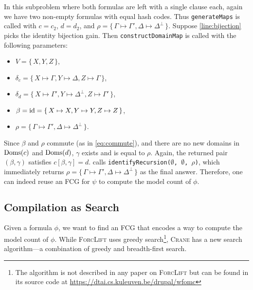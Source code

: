 \begin{example}
  In this subproblem where both formulas are left with a single clause each,
  again we have two non-empty formulas with equal hash codes. Thus
  \texttt{generateMaps} is called with $c = c_2$, $d = d_2$, and
  $\rho = \{\, \Gamma \mapsto \Gamma', \Delta \mapsto \Delta^\bot \,\}$. Suppose
  \cref{line:bijection} picks the identity bijection gain. Then
  \texttt{constructDomainMap} is called with the following parameters:
  \begin{itemize}
    \item $V = \{\, X, Y, Z \,\}$,
    \item
          $\delta_c = \{\, X \mapsto \Gamma, Y \mapsto \Delta, Z \mapsto \Gamma \,\}$,
    \item
          $\delta_d = \{\, X \mapsto \Gamma', Y \mapsto \Delta^\bot, Z \mapsto \Gamma' \,\}$,
    \item $\beta = \operatorname{id} = \{\, X \mapsto X, Y \mapsto Y, Z \mapsto Z \,\}$,
    \item $\rho = \{\, \Gamma \mapsto \Gamma', \Delta \mapsto \Delta^\bot \,\}$.
  \end{itemize}
  Since $\beta$ and $\rho$ commute (as in \cref{eq:commute}), and there are no
  new domains in $\operatorname{Doms}(c)$ and $\operatorname{Doms}(d)$, $\gamma$ exists and is equal to
  $\rho$. Again, the returned pair $(\beta, \gamma)$ satisfies
  $c[\beta, \gamma] = d$.  calls
  \texttt{identifyRecursion($\emptyset$, $\emptyset$, $\rho$)}, which
  immediately returns
  $\rho = \{\, \Gamma \mapsto \Gamma', \Delta \mapsto \Delta^\bot \,\}$ as the
  final answer. Therefore, one can indeed reuse an FCG for $\psi$ to compute the
  model count of $\phi$.
\end{example}

\subsection{Compilation as Search}\label{sec:search}

Given a formula $\phi$, we want to find an FCG that encodes a way to compute the
model count of $\phi$. While \textsc{ForcLift}
\citep{DBLP:conf/ijcai/BroeckTMDR11} uses greedy search\footnote{The algorithm
  is not described in any paper on \textsc{ForcLift} but can be found in its
  source code at \url{https://dtai.cs.kuleuven.be/drupal/wfomc}}, \textsc{Crane}
has a new search algorithm---a combination of greedy and breadth-first search.

